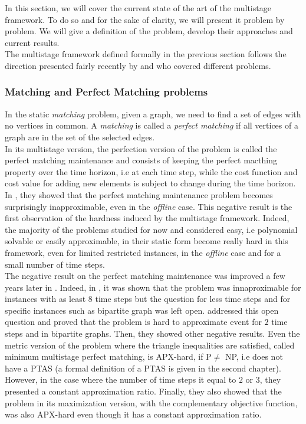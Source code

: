 \documentclass[a4paper]{book}
\begin{document}
In this section, we will cover the current state of the art of the multistage framework. To do so and for the sake of clarity, we will present it problem by problem. We will give a definition of the problem, develop their approaches and current results.\\
The multistage framework defined formally in the previous section follows the direction presented fairly recently by \cite{Gupta} and \cite{Eisenstat} who covered different problems.

\subsubsection{Matching and Perfect Matching problems}
In the static {\emph {matching}} problem, given a graph, we need to find a set of edges with no vertices in common. A {\emph {matching}} is called a {\emph {perfect matching}} if all vertices of a graph are in the set of the selected edges.\\ 
In its multistage version, the perfection version of the problem is called the {\sc perfect matching maintenance} and consists of keeping the perfect macthing property over the time horizon, i.e at each time step, while the cost function and cost value for adding new elements is subject to change during the time horizon.\\

In \cite{Gupta}, they showed that the {\sc perfect matching maintenance} problem becomes surprisingly inapproximable, even in the \emph{offline} case. This negative result is the first observation of the hardness induced by the multistage framework. Indeed, the majority of the problems studied for now and considered easy, i.e polynomial solvable or easily approximable, in their static form become really hard in this framework, even for limited restricted instances, in the \emph{offline} case and for a small number of time steps.\\

The negative result on the {\sc perfect matching maintenance} was improved a few years later in \cite{bampis2018multistage}. Indeed, in \cite{Gupta}, it was shown that the problem was innaproximable for instances with as least $8$ time steps but the question for less time steps and for specific instances such as bipartite graph was left open. \cite{bampis2018multistage} addressed this open question and proved that the problem is hard to approximate event for $2$ time steps and in bipartite graphs. Then, they showed other negative results. Even the metric version of the problem where the triangle inequalities are satisfied, called {\sc minimum multistage perfect matching}, is APX-hard, if P$\ne$ NP, i.e does not have a PTAS (a formal definition of a PTAS is given in the second chapter). However, in the case where the number of time steps it equal to $2$ or $3$, they presented a constant approximation ratio. Finally, they also showed that the problem in its maximization version, with the complementary objective function, was also APX-hard even though it has a constant approximation ratio. \\
\end{document}
